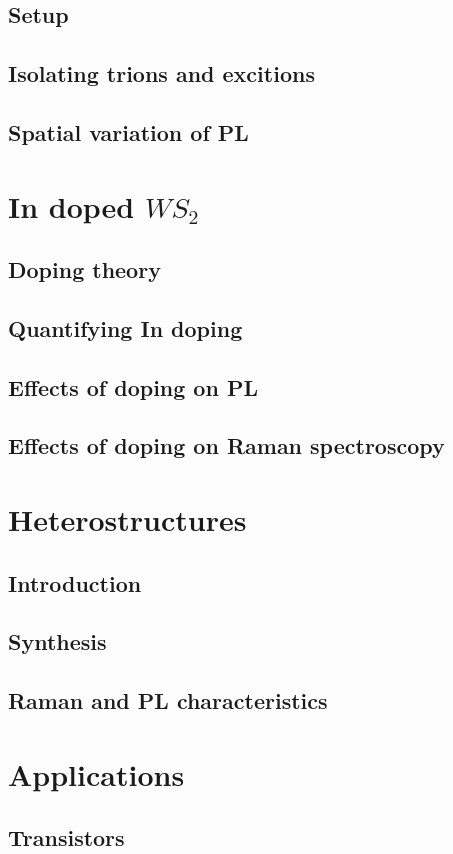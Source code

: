 \documentclass[12pt]{article}
\begin{document}
	\subsection{Setup}
	\subsection{Isolating trions and excitions}
	\subsection{Spatial variation of PL}
\section{In doped $WS_2$}
	\subsection{Doping theory}
	\subsection{Quantifying In doping}
	\subsection{Effects of doping on PL}
	\subsection{Effects of doping on Raman spectroscopy}
\section{Heterostructures}
	\subsection{Introduction}
	\subsection{Synthesis}
	\subsection{Raman and PL characteristics}
\section{Applications}
	\subsection{Transistors}
\end{document}
